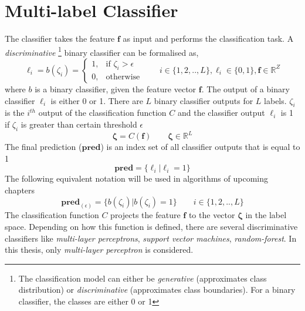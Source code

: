 \section{Multi-label Classifier}
\label{classifier}
The classifier takes the feature $\textbf{f}$ as input and performs the classification task. A \textit{discriminative} \footnote{The classification model can either be \textit{generative} (approximates class distribution) or \textit{discriminative} (approximates class boundaries). For a binary classifier, the classes are either 0 or 1} binary classifier can be formalised as, 
\[
\ell_{i} = b(\zeta_{i}) =
\begin{cases}
1, & \text{if  } \zeta_{i} > \epsilon \\
0, & \text{otherwise}
\end{cases}
\qquad i \in \{1,2,..,L\}, \ell_{i} \in \{0,1\}, \textbf{f} \in \mathbb{R}^{Z}
\]
where $b$ is a binary classifier, given the feature vector $\textbf{f}$. The output of a binary classifier $\ell_{i}$ is either 0 or 1. There are $L$ binary classifier outputs for $L$ labels. $\zeta_{i}$ is the $i^{th}$ output of the classification function $C$ and the classifier output $\ell_{i}$ is 1 if $\zeta_{i}$ is greater than certain threshold $\epsilon$ 
\[
\bm{\zeta} = C(\textbf{f}) \qquad \bm{\zeta} \in \mathbb{R}^{L}
\]
The final prediction ($\textbf{pred}$) is an index set of all classifier outputs that is equal to 1 
\[
\textbf{pred} = \{\ell_{i} | \ell_{i} = 1 \}
\]
The following equivalent notation will be used in algorithms of upcoming chapters 
\[
\textbf{pred}_{(\epsilon)} = \{ b(\zeta_{i}) | b(\zeta_{i}) = 1 \} \qquad i \in \{1,2,..,L\}
\]
The classification function $C$ projects the feature $\textbf{f}$ to the vector $\bm{\zeta}$ in the label space. Depending on how this function is defined, there are several discriminative classifiers like \textit{multi-layer perceptrons}, \textit{support vector machines}, \textit{random-forest}. In this thesis, only \textit{multi-layer perceptron} is considered.


